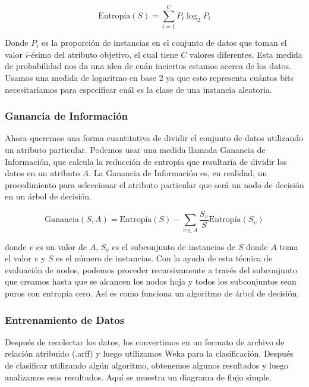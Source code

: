 \begin{equation}
    \text{Entropía}(S) = \sum_{i=1}^{C} P_i \log_{2} P_i
\end{equation}
    
Donde $P_i$ es la proporción de instancias en el conjunto de datos que toman el valor $i$-ésimo del atributo objetivo, el cual tiene $C$ valores diferentes. Esta medida de probabilidad nos da una idea de cuán inciertos estamos acerca de los datos. Usamos una medida de logaritmo en base 2 ya que esto representa cuántos bits necesitaríamos para especificar cuál es la clase de una instancia aleatoria.

\subsubsection{Ganancia de Información}
Ahora queremos una forma cuantitativa de dividir el conjunto de datos utilizando un atributo particular. Podemos usar una medida llamada Ganancia de Información, que calcula la reducción de entropía que resultaría de dividir los datos en un atributo $A$. La Ganancia de Información es, en realidad, un procedimiento para seleccionar el atributo particular que será un nodo de decisión en un árbol de decisión.

\begin{equation}
   \text{Ganancia}(S, A) = \text{Entropía}(S) - \sum_{\upsilon \in A} \frac{S_{\upsilon}}{S} \text{Entropía}(S_{\upsilon})
\end{equation}

donde $v$ es un valor de $A$, $S_v$ es el subconjunto de instancias de $S$ donde $A$ toma el valor $v$ y $S$ es el número de instancias. Con la ayuda de esta técnica de evaluación de nodos, podemos proceder recursivamente a través del subconjunto que creamos hasta que se alcancen los nodos hoja y todos los subconjuntos sean puros con entropía cero. Así es como funciona un algoritmo de árbol de decisión.


\subsubsection{Entrenamiento de Datos}

Después de recolectar los datos, los convertimos en un formato de archivo de relación atribuido (.arff) y luego utilizamos Weka para la clasificación. Después de clasificar utilizando algún algoritmo, obtenemos algunos resultados y luego analizamos esos resultados. Aquí se muestra un diagrama de flujo simple.

